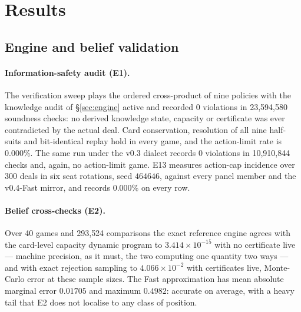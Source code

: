 \documentclass[11pt]{article}
\theoremstyle{definition}
\DeclareRobustCommand{\vfast}{\texorpdfstring{\mbox{v0.4-Fast}}{v0.4-Fast}}
\newcommand{\numAuditChecks}{23{,}594{,}580}
\newcommand{\numAuditViolations}{0}
\newcommand{\numAuditChecksLegacy}{10{,}910{,}844}
\newcommand{\numBeliefVsCardDP}{3.414\times 10^{-15}}
\newcommand{\numBeliefVsSampling}{4.066\times 10^{-2}}
\newcommand{\numSinkhornMean}{0.01705}
\newcommand{\numSinkhornMax}{0.4982}
\newcommand{\numLimitRate}{0.000\%}
\newcommand{\numSelftestGames}{40}
\newcommand{\numSelftestChecks}{293{,}524}
\newcommand{\numEthirteenDeals}{300}
\begin{document}
\section{Results}
\label{sec:results}

\renewcommand{\topfraction}{0.92}
\renewcommand{\bottomfraction}{0.75}
\renewcommand{\textfraction}{0.06}
\renewcommand{\floatpagefraction}{0.80}
\setcounter{topnumber}{3}
\setcounter{bottomnumber}{2}
\setcounter{totalnumber}{4}
\setlength{\textfloatsep}{12pt plus 2pt minus 4pt}
\setlength{\floatsep}{10pt plus 2pt minus 3pt}
\setlength{\intextsep}{12pt plus 2pt minus 3pt}

\subsection{Engine and belief validation}
\label{sec:results-verify}

\paragraph{Information-safety audit (E1).}
The verification sweep plays the ordered cross-product of nine policies with the
knowledge audit of \S\ref{sec:engine} active and recorded \numAuditViolations{}
violations in \numAuditChecks{} soundness checks: no derived knowledge state,
capacity or certificate was ever contradicted by the actual deal. Card
conservation, resolution of all nine half-suits and bit-identical replay hold in
every game, and the action-limit rate is \numLimitRate{}. The same run under the
v0.3 dialect records \numAuditViolations{} violations in \numAuditChecksLegacy{}
checks and, again, no action-limit game. E13 measures action-cap incidence over
\numEthirteenDeals{} deals in six seat rotations, seed $464646$, against every
panel member and the \vfast{} mirror, and records \numLimitRate{} on every row.

\paragraph{Belief cross-checks (E2).}
Over \numSelftestGames{} games and \numSelftestChecks{} comparisons the exact
reference engine agrees with the card-level capacity dynamic program to
$\numBeliefVsCardDP$ with no certificate live --- machine precision, as it must,
the two computing one quantity two ways --- and with exact rejection sampling to
$\numBeliefVsSampling$ with certificates live, Monte-Carlo error at these sample
sizes. The Fast approximation has mean absolute marginal error $\numSinkhornMean$
and maximum $\numSinkhornMax$: accurate on average, with a heavy tail that E2
does not localise to any class of position.
\end{document}
